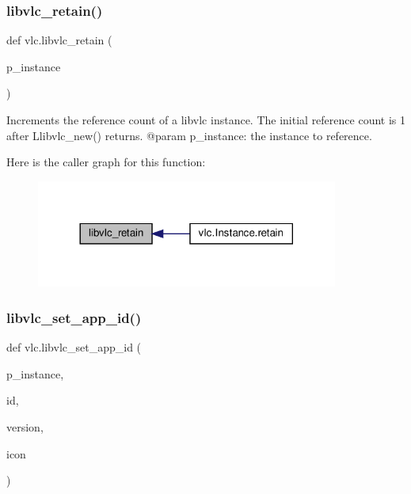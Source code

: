 \subsubsection{\texorpdfstring{libvlc\+\_\+retain()}{libvlc\_retain()}}
{\footnotesize\ttfamily def vlc.\+libvlc\+\_\+retain (\begin{DoxyParamCaption}\item[{}]{p\+\_\+instance }\end{DoxyParamCaption})}

\begin{DoxyVerb}Increments the reference count of a libvlc instance.
The initial reference count is 1 after L{libvlc_new}() returns.
@param p_instance: the instance to reference.
\end{DoxyVerb}
 Here is the caller graph for this function\+:
\nopagebreak
\begin{figure}[H]
\begin{center}
\leavevmode
\includegraphics[width=281pt]{namespacevlc_aeb98ef45d43c6f9348d8450963f08840_icgraph}
\end{center}
\end{figure}
\mbox{\label{namespacevlc_a4d48c4354ffe3aa12ee4201cca0f0dac}} 
\subsubsection{\texorpdfstring{libvlc\+\_\+set\+\_\+app\+\_\+id()}{libvlc\_set\_app\_id()}}
{\footnotesize\ttfamily def vlc.\+libvlc\+\_\+set\+\_\+app\+\_\+id (\begin{DoxyParamCaption}\item[{}]{p\+\_\+instance,  }\item[{}]{id,  }\item[{}]{version,  }\item[{}]{icon }\end{DoxyParamCaption})}


